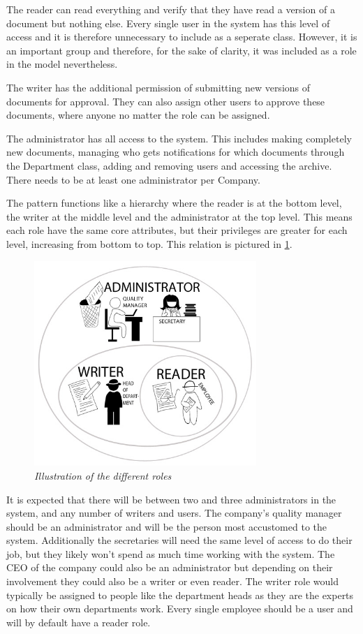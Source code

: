 The reader can read everything and verify that they have read a version of a document but nothing else.
Every single user in the system has this level of access and it is therefore unnecessary to include as a seperate class.
However, it is an important group and therefore, for the sake of clarity, it was included as a role in the model nevertheless.

The writer has the additional permission of submitting new versions of documents for approval. They can also assign other users to approve these documents, where anyone no matter the role can be assigned.

The administrator has all access to the system.
This includes making completely new documents, managing who gets notifications for which documents through the Department class, adding and removing users and accessing the archive.
There needs to be at least one administrator per Company.

The pattern functions like a hierarchy where the reader is at the bottom level, the writer at the middle level and the administrator at the top level. This means each role have the same core attributes, but their privileges are greater for each level, increasing from bottom to top.
This relation is pictured in \cref{fig:RoleIllustration}.

\begin{figure}[H]
	\centering
	\includegraphics[width=0.75\textwidth]{billeder/RP-Roller2.jpg}
	\caption{\textit{Illustration of the different roles
	}\label{fig:RoleIllustration}}
\end{figure}

It is expected that there will be between two and three administrators in the system, and any number of writers and users.
The company's quality manager should be an administrator and will be the person most accustomed to the system.
Additionally the secretaries will need the same level of access to do their job, but they likely won't spend as much time working with the system.
The CEO of the company could also be an administrator but depending on their involvement they could also be a writer or even reader.
The writer role would typically be assigned to people like the department heads as they are the experts on how their own departments work.
Every single employee should be a user and will by default have a reader role.

